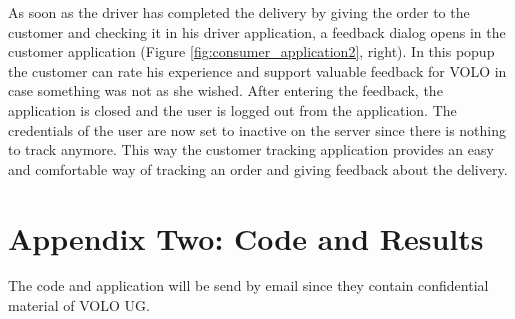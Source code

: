As soon as the driver has completed the delivery by giving the order to the customer and checking it in his driver application, a feedback dialog opens in the customer application (Figure \ref{fig:consumer_application2}, right). In this popup the customer can rate his experience and support valuable feedback for VOLO in case something was not as she wished.\newline
After entering the feedback, the application is closed and the user is logged out from the application. The credentials of the user are now set to inactive on the server since there is nothing to track anymore.\newline
This way the customer tracking application provides an easy and comfortable way of tracking an order and giving feedback about the delivery.
\newpage
\section{Appendix Two: Code and Results}\label{section:Appendix Two: Code and Results}

The code and application will be send by email since they contain confidential material of VOLO UG.
